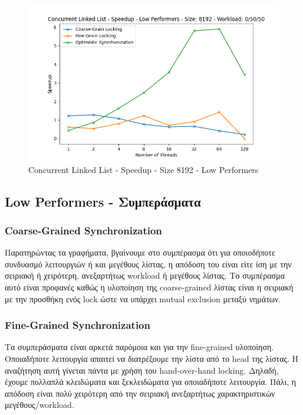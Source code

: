 \documentclass[../final_report.tex]{subfiles}
\begin{document}
\begin{figure}[H]
        \includegraphics[scale=0.4]{outFiles/plots/concurrent_data_structs_low_speedup_8192_0_50_50.png}
    \caption{Concurrent Linked List - Speedup - Size 8192 - Low Performers}
    \label{fig:Concurrent Linked List - Speedup - Size 8192 - Low Performers}
\end{figure}

\subsection*{Low Performers - Συμπεράσματα}

\subsubsection*{Coarse-Grained Synchronization}
Παρατηρώντας τα γραφήματα, βγαίνουμε στο συμπέρασμα ότι για οποιοδήποτε συνδυασμό λειτουργιών ή και
μεγέθους λίστας, η απόδοση του είναι είτε ίση με την σειριακή ή χειρότερη, ανεξαρτήτως workload ή μεγέθους λίστας. Το συμπέρασμα αυτό είναι 
προφανές καθώς η υλοποίηση της coarse-grained λίστας είναι η σειριακή με την προσθήκη ενός lock ώστε
να υπάρχει mutual exclusion μεταξύ νημάτων. 

\subsubsection*{Fine-Grained Synchronization}
Τα συμπεράσματα είναι αρκετά παρόμοια και για την fine-grained υλοποίηση. Οποιαδήποτε λειτουργία απαιτεί να διατρέξουμε
την λίστα από το head της λίστας. Η αναζήτηση αυτή γίνεται πάντα με χρήση του hand-over-hand locking. Δηλαδή, έχουμε πολλαπλά
κλειδώματα και ξεκλειδώματα για οποιαδήποτε λειτουργία. Πάλι, η απόδοση είναι πολύ χειρότερη από την σειριακή ανεξαρτήτως
χαρακτηριστικών μεγέθους/workload.
\end{document}
